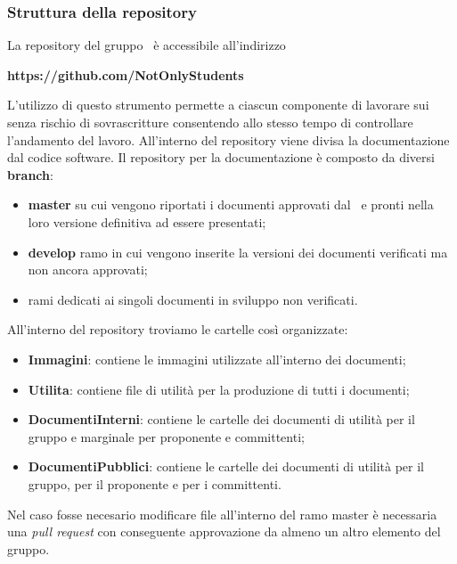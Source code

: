 \subsubsection{Struttura della repository}\label{StrutturaRepo}
La repository del gruppo \Gruppo\ è accessibile all'indirizzo
\begin{center}
	\textbf{https://github.com/NotOnlyStudents}
\end{center}
L'utilizzo di questo strumento permette a ciascun componente di lavorare sui  senza rischio di sovrascritture consentendo allo stesso tempo di controllare l'andamento del lavoro. 
All'interno del repository viene divisa la documentazione dal codice software.
\label{RepoDoc}
Il repository per la documentazione è composto da diversi \textbf{branch}:
\begin{itemize}
	\item \textbf{master} su cui vengono riportati i documenti approvati dal \Responsabile\ e pronti nella loro versione definitiva ad essere presentati;
	\item \textbf{develop} ramo in cui vengono inserite la versioni dei documenti verificati ma non ancora approvati;
	\item rami dedicati ai singoli documenti in sviluppo non verificati.
\end{itemize}
All'interno del repository troviamo le cartelle così organizzate:
\begin{itemize}
	\item \textbf{Immagini}: contiene le immagini utilizzate all'interno dei documenti;
	\item \textbf{Utilita}: contiene file di utilità per la produzione di tutti i documenti;
	\item \textbf{DocumentiInterni}: contiene le cartelle dei documenti di utilità per il gruppo e marginale per proponente e committenti;
	\item \textbf{DocumentiPubblici}: contiene le cartelle dei documenti di utilità per il gruppo, per il proponente e per i committenti.
\end{itemize}
\label{ModificaRepo}
Nel caso fosse necesario modificare file all'interno del ramo master è necessaria una \textit{pull request} con conseguente approvazione da almeno un altro elemento del gruppo.